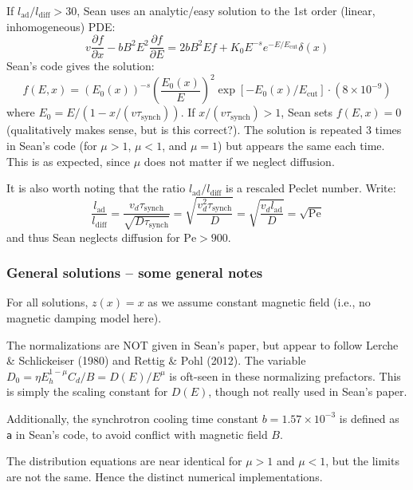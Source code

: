 \documentclass[10pt]{article}
\newcommand{\mt}{\mathrm}
\newcommand{\ptl}{\partial} %
\begin{document}
If $l_{\mt{ad}} / l_{\mt{diff}} > 30$, Sean uses an analytic/easy solution to
the 1st order (linear, inhomogeneous) PDE:
\[
    v \frac{\ptl f}{\ptl x} - b B^2 E^2 \frac{\ptl f}{\ptl E}
    = 2 b B^2 E f + K_0 E^{-s} e^{-E/E_{\mt{cut}}} \delta(x)
\]
Sean's code gives the solution:
\[
    f(E,x) = (E_0(x))^{-s} \left(\frac{E_0(x)}{E}\right)^2
    \exp \left[ -E_0(x)/E_{\mt{cut}} \right] \cdot \left(8\times10^{-9}\right)
\]
where $E_0 = E / (1 - x/(v\tau_{\mt{synch}}))$.
If $x / (v \tau_{\mt{synch}}) > 1$, Sean sets $f(E,x) = 0$ (qualitatively makes
sense, but is this correct?).
The solution is repeated 3 times in Sean's code (for $\mu > 1$, $\mu < 1$, and
$\mu = 1$) but appears the same each time.  This is as expected, since $\mu$
does not matter if we neglect diffusion.

It is also worth noting that the ratio $l_{\mt{ad}} / l_{\mt{diff}}$ is a
rescaled Peclet number.  Write:
\[
    \frac{l_{\mt{ad}}}{l_{\mt{diff}}}
    = \frac{ v_d \tau_{\mt{synch}} }{ \sqrt{D \tau_{\mt{synch}}} }
    = \sqrt{ \frac{ v_d^2 \tau_{\mt{synch}} }{ D } }
    = \sqrt{ \frac{ v_d l_{\mt{ad}} }{ D } }
    = \sqrt{\mt{Pe}}
\]
and thus Sean neglects diffusion for $\mt{Pe} > 900$.


\subsubsection{General solutions -- some general notes}

For all solutions, $z(x) = x$ as we assume constant magnetic field (i.e., no
magnetic damping model here).

The normalizations are NOT given in Sean's paper, but appear to follow
Lerche \& Schlickeiser (1980) and Rettig \& Pohl (2012).  The variable
$D_0 = \eta E_h^{1-\mu} C_d / B = D(E) / E^\mu$ is oft-seen in these
normalizing prefactors.  This is simply the scaling constant for $D(E)$, though
not really used in Sean's paper.

Additionally, the synchrotron cooling time constant $b = 1.57 \times 10^{-3}$
is defined as {\tt{a}} in Sean's code, to avoid conflict with magnetic field
$B$.

The distribution equations are near identical for $\mu > 1$ and $\mu < 1$,
but the limits are not the same.  Hence the distinct numerical implementations.

\end{document}
